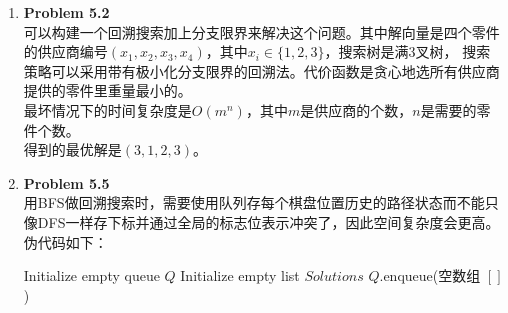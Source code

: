 \documentclass{ctexart}
\begin{document}
\begin{enumerate}[label=\arabic*.]
\begin{enumerate}[label=(\arabic*)]
        \end{enumerate}
    \item \textbf{Problem 5.2}\\
        可以构建一个回溯搜索加上分支限界来解决这个问题。其中解向量是四个零件的供应商编号$(x_1,x_2,x_3,x_4)$，其中$x_i\in\{1,2,3\}$，搜索树是满3叉树，
        搜索策略可以采用带有极小化分支限界的回溯法。代价函数是贪心地选所有供应商提供的零件里重量最小的。\\
        最坏情况下的时间复杂度是$O(m^n)$，其中$m$是供应商的个数，$n$是需要的零件个数。\\
        得到的最优解是$(3,1,2,3)$。
    \item \textbf{Problem 5.5}\\
        用BFS做回溯搜索时，需要使用队列存每个棋盘位置历史的路径状态而不能只像DFS一样存下标并通过全局的标志位表示冲突了，因此空间复杂度会更高。伪代码如下：\\
        \begin{algorithm}[H]
            \caption{基于广度优先搜索求解 $N$ 皇后问题}
            
            Initialize empty queue $Q$\;
            Initialize empty list $Solutions$\;
            $Q$.enqueue(空数组 $[]$) 
            
\end{algorithm}
\end{enumerate}
\end{document}
